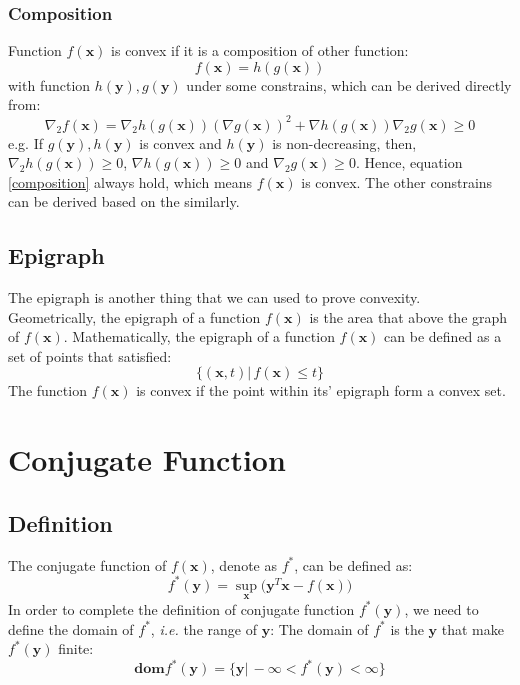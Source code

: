 \documentclass[10pt,a4paper]{article}
\begin{document}
\subsubsection{Composition}
Function $f(\mathbf{x})$ is convex if it is a composition of other function:
\begin{equation*}
	f(\mathbf{x}) = h(g(\mathbf{x}))
\end{equation*}
with function $h(\mathbf{y}), g(\mathbf{y})$ under some constrains, which can be derived directly from:
\begin{equation}
	\nabla_{2}f(\mathbf{x}) = \nabla_{2} h(g(\mathbf{x})) (\nabla g(\mathbf{x}))^{2} + \nabla h(g(\mathbf{x})) \nabla_{2}g(\mathbf{x}) \geq 0
	\label{composition}
\end{equation}
e.g. If $g(\mathbf{y}), h(\mathbf{y})$ is convex and $h(\mathbf{y})$ is non-decreasing, then, $\nabla_{2} h(g(\mathbf{x})) \geq 0$, $\nabla h(g(\mathbf{x})) \geq 0$ and $\nabla_{2} g(\mathbf{x}) \geq 0$. Hence, equation \ref{composition} always hold, which means $f(\mathbf{x})$ is convex. The other constrains can be derived based on the similarly.

\subsection{Epigraph}
The epigraph is another thing that we can used to prove convexity. Geometrically, the epigraph of a function $f(\mathbf{x})$ is the area that above the graph of $f(\mathbf{x})$. Mathematically, the epigraph of a function $f(\mathbf{x})$ can be defined as a set of points that satisfied:
\begin{equation*}
	\{ (\mathbf{x}, t) |\, f(\mathbf{x}) \leq t \}
\end{equation*} 
The function $f(\mathbf{x})$ is convex if the point within its' epigraph form a convex set.

\section{Conjugate Function}

\subsection{Definition}
The conjugate function of $f(\mathbf{x})$, denote as $f^{*}$, can be defined as:
\begin{equation}
	f^{*}(\mathbf{y}) = \displaystyle\sup_{\mathbf{x}} \Big(\mathbf{y}^{T} \mathbf{x} - f(\mathbf{x}) \Big)
	\label{conjugate}
\end{equation}
In order to complete the definition of conjugate function $f^{*}(\mathbf{y})$, we need to define the domain of $f^{*}$, \textsl{i.e.} the range of $\mathbf{y}$: The domain of $f^{*}$ is the $\mathbf{y}$ that make $f^{*}(\mathbf{y})$ finite:
\begin{equation*}
	\mathbf{dom}f^{*}(\mathbf{y}) = \{ \mathbf{y} |\, -\infty < f^{*}(\mathbf{y}) < \infty \}
\end{equation*}
\end{document}
